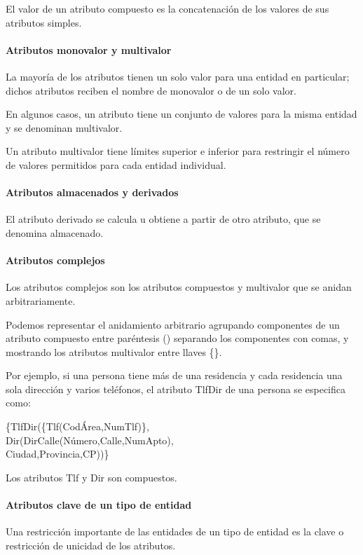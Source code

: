 El valor de un atributo compuesto es la concatenación de los valores de sus atributos simples.

\paragraph*{Atributos monovalor y multivalor}  La mayoría de los atributos tienen un solo valor para una entidad en particular; dichos atributos reciben el nombre de monovalor o de un solo valor. 


En algunos casos, un atributo tiene un conjunto de valores para la misma entidad y se denominan multivalor.


Un atributo multivalor tiene límites superior e inferior para restringir el número de valores permitidos para cada entidad individual.


\paragraph*{Atributos almacenados y derivados}
El atributo derivado se calcula u obtiene a partir de otro atributo, que se denomina almacenado.


\paragraph*{Atributos complejos}

Los atributos complejos son los atributos compuestos y multivalor que se anidan arbitrariamente.

Podemos representar el anidamiento arbitrario agrupando componentes de un atributo compuesto entre paréntesis () separando los componentes con comas, y mostrando los atributos multivalor entre llaves \{\}. 

Por ejemplo, si una persona tiene más de una residencia y cada
residencia una sola dirección y varios teléfonos, el atributo TlfDir de una persona se especifica como:


\{TlfDir(\{Tlf(CodÁrea,NumTlf)\},\\
Dir(DirCalle(Número,Calle,NumApto),\\
Ciudad,Provincia,CP))\}


Los atributos Tlf y Dir son compuestos.
\paragraph*{Atributos clave de un tipo de entidad}
Una restricción importante de las entidades de un tipo de entidad es la clave o restricción de unicidad de los atributos.


